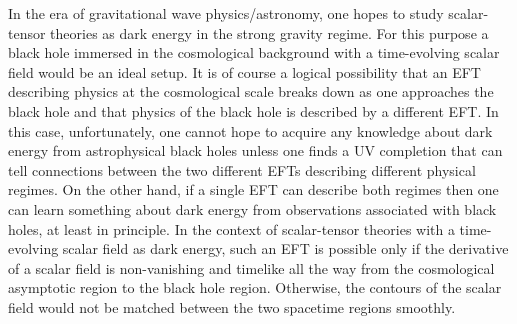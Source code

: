 \documentclass[a4paper,11pt]{article}
\numberwithin{equation}{section}
\begin{document}
In the era of gravitational wave physics/astronomy, one hopes to study scalar-tensor theories as dark energy in the strong gravity regime. For this purpose a black hole immersed in the cosmological background with a time-evolving scalar field would be an ideal setup. It is of course a logical possibility that an EFT describing physics at the cosmological scale breaks down as one approaches the black hole and that physics of the black hole is described by a different EFT. In this case, unfortunately, one cannot hope to acquire any knowledge about dark energy from astrophysical black holes unless one finds a UV completion that can tell connections between the two different EFTs describing different physical regimes. On the other hand, if a single EFT can describe both regimes then one can learn something about dark energy from observations associated with black holes, at least in principle. In the context of scalar-tensor theories with a time-evolving scalar field as dark energy, such an EFT is possible only if the derivative of a scalar field is non-vanishing and timelike all the way from the cosmological asymptotic region to the black hole region. Otherwise, the contours of the scalar field would not be matched between the two spacetime regions smoothly. 
\end{document}
